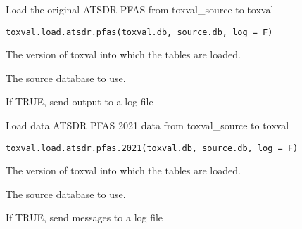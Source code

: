 \documentclass[letterpaper]{book}
\begin{document}
%
\begin{Description}\relax
Load the original ATSDR PFAS from toxval\_source to toxval
\end{Description}
%
\begin{Usage}
\begin{verbatim}
toxval.load.atsdr.pfas(toxval.db, source.db, log = F)
\end{verbatim}
\end{Usage}
%
\begin{Arguments}
\begin{ldescription}
\item[\code{toxval.db}] The version of toxval into which the tables are loaded.

\item[\code{source.db}] The source database to use.

\item[\code{log}] If TRUE, send output to a log file
\end{ldescription}
\end{Arguments}
%
\begin{Description}\relax
Load data ATSDR PFAS 2021 data from toxval\_source to toxval
\end{Description}
%
\begin{Usage}
\begin{verbatim}
toxval.load.atsdr.pfas.2021(toxval.db, source.db, log = F)
\end{verbatim}
\end{Usage}
%
\begin{Arguments}
\begin{ldescription}
\item[\code{toxval.db}] The version of toxval into which the tables are loaded.

\item[\code{source.db}] The source database to use.

\item[\code{log}] If TRUE, send messages to a log file
\end{ldescription}
\end{Arguments}
\end{document}
